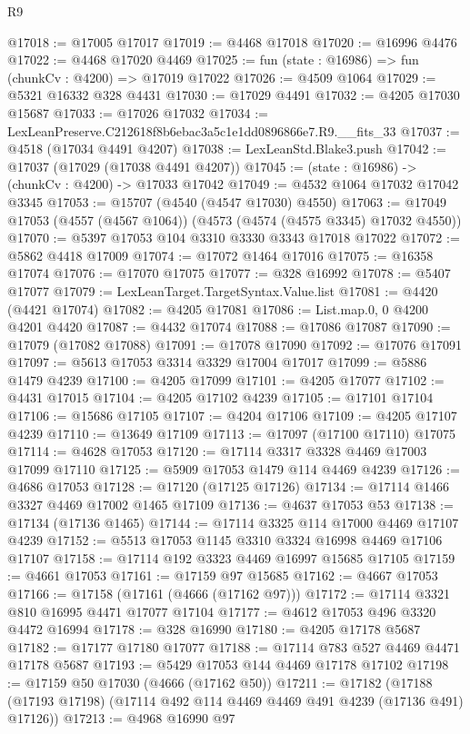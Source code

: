 \begin{lexlean}{R9}
\begin{coremodule}
@17018 := @17005 @17017
@17019 := @4468 @17018
@17020 := @16996 @4476
@17022 := @4468 @17020 @4469
@17025 := fun (state : @16986) => fun (chunkCv : @4200) => @17019 @17022
@17026 := @4509 @1064
@17029 := @5321 @16332 @328 @4431
@17030 := @17029 @4491
@17032 := @4205 @17030 @15687
@17033 := @17026 @17032
@17034 := LexLeanPreserve.C212618f8b6ebac3a5c1e1dd0896866e7.R9.__fits_33
@17037 := @4518 (@17034 @4491 @4207)
@17038 := LexLeanStd.Blake3.push
@17042 := @17037 (@17029 (@17038 @4491 @4207))
@17045 := (state : @16986) -> (chunkCv : @4200) -> @17033 @17042
@17049 := @4532 @1064 @17032 @17042 @3345
@17053 := @15707 (@4540 (@4547 @17030) @4550)
@17063 := @17049 @17053 (@4557 (@4567 @1064)) (@4573 (@4574 (@4575 @3345) @17032 @4550))
@17070 := @5397 @17053 @104 @3310 @3330 @3343 @17018 @17022
@17072 := @5862 @4418 @17009
@17074 := @17072 @1464 @17016
@17075 := @16358 @17074
@17076 := @17070 @17075
@17077 := @328 @16992
@17078 := @5407 @17077
@17079 := LexLeanTarget.TargetSyntax.Value.list
@17081 := @4420 (@4421 @17074)
@17082 := @4205 @17081
@17086 := List.map.{0, 0} @4200 @4201 @4420
@17087 := @4432 @17074
@17088 := @17086 @17087
@17090 := @17079 (@17082 @17088)
@17091 := @17078 @17090
@17092 := @17076 @17091
@17097 := @5613 @17053 @3314 @3329 @17004 @17017
@17099 := @5886 @1479 @4239
@17100 := @4205 @17099
@17101 := @4205 @17077
@17102 := @4431 @17015
@17104 := @4205 @17102 @4239
@17105 := @17101 @17104
@17106 := @15686 @17105
@17107 := @4204 @17106
@17109 := @4205 @17107 @4239
@17110 := @13649 @17109
@17113 := @17097 (@17100 @17110) @17075
@17114 := @4628 @17053
@17120 := @17114 @3317 @3328 @4469 @17003 @17099 @17110
@17125 := @5909 @17053 @1479 @114 @4469 @4239
@17126 := @4686 @17053
@17128 := @17120 (@17125 @17126)
@17134 := @17114 @1466 @3327 @4469 @17002 @1465 @17109
@17136 := @4637 @17053 @53
@17138 := @17134 (@17136 @1465)
@17144 := @17114 @3325 @114 @17000 @4469 @17107 @4239
@17152 := @5513 @17053 @1145 @3310 @3324 @16998 @4469 @17106 @17107
@17158 := @17114 @192 @3323 @4469 @16997 @15685 @17105
@17159 := @4661 @17053
@17161 := @17159 @97 @15685
@17162 := @4667 @17053
@17166 := @17158 (@17161 (@4666 (@17162 @97)))
@17172 := @17114 @3321 @810 @16995 @4471 @17077 @17104
@17177 := @4612 @17053 @496 @3320 @4472 @16994
@17178 := @328 @16990
@17180 := @4205 @17178 @5687
@17182 := @17177 @17180 @17077
@17188 := @17114 @783 @527 @4469 @4471 @17178 @5687
@17193 := @5429 @17053 @144 @4469 @17178 @17102
@17198 := @17159 @50 @17030 (@4666 (@17162 @50))
@17211 := @17182
    (@17188 (@17193 @17198) (@17114 @492 @114 @4469 @4469 @491 @4239 (@17136 @491) @17126))
@17213 := @4968 @16990 @97

\end{coremodule}
\end{lexlean}

